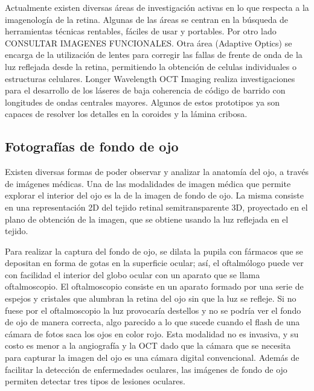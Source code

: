 Actualmente existen diversas \'areas de investigación activas en lo que respecta a la imagenología de la retina. Algunas de las \'areas se centran en la b\'usqueda de herramientas t\'ecnicas rentables, f\'aciles de usar y portables. Por otro lado CONSULTAR IMAGENES FUNCIONALES. Otra \'area (Adaptive Optics) se encarga de la utilizaci\'on de lentes para corregir las fallas de frente de onda de la luz reflejada desde la retina, permitiendo la obtenci\'on de celulas individuales o estructuras celulares.
Longer Wavelength OCT Imaging realiza investigaciones para el desarrollo de los l\'aseres de baja coherencia de c\'odigo de barrido con longitudes de ondas centrales mayores. Algunos de estos prototipos ya son capaces de resolver los detalles en la coroides y la l\'amina cribosa.







\subsection{Fotograf\'ias de fondo de ojo}


Existen diversas formas de poder observar y analizar la anatom\'ia del ojo, a trav\'es de im\'agenes m\'edicas. 
Una de las modalidades de imagen m\'edica que permite explorar el interior del ojo es la de la imagen de fondo de ojo. La misma consiste en  una representaci\'on 2D del tejido retinal semitransparente 3D, proyectado en el plano de obtenci\'on de la imagen, que se obtiene usando la luz reflejada en el tejido.

Para realizar la captura del fondo de ojo, se dilata la pupila con f\'armacos que se depositan en forma de gotas en la superficie ocular; as\'i, el oftalm\'ologo puede ver con facilidad el interior del globo ocular con un aparato que se llama oftalmoscopio. El oftalmoscopio consiste en un aparato formado por una serie de espejos y cristales que alumbran la retina del ojo sin que la luz se refleje. Si no fuese por el oftalmoscopio la luz provocar\'ia destellos y no se podría ver el fondo de ojo de manera correcta, algo parecido a lo que sucede cuando el flash de una cámara de fotos saca los ojos en color rojo. Esta modalidad no es invasiva, y su costo es menor a la angiografía y la OCT dado que la c\'amara que se necesita para capturar la imagen del ojo es una c\'amara digital convencional.
Adem\'as de facilitar la detecci\'on de enfermedades oculares, las im\'agenes de fondo de ojo permiten detectar tres tipos de lesiones oculares. 


